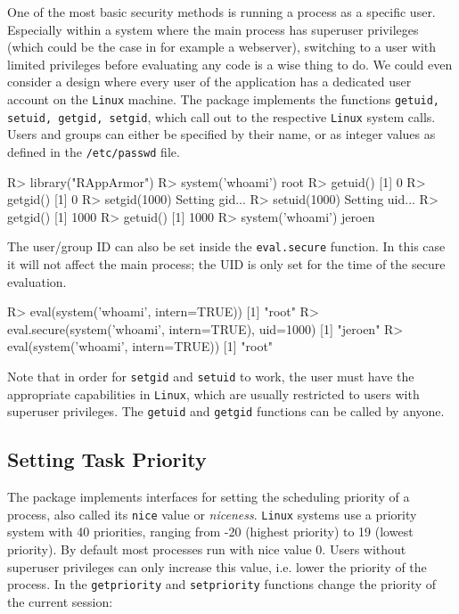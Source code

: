 \documentclass[article]{jss}
\newcommand{\RAppArmor}{\pkg{RAppArmor}\xspace}
\newcommand{\Linux}{\texttt{Linux}\xspace}
\begin{document}
One of the most basic security methods is running a process as a specific user.
Especially within a system where the main process has superuser privileges
(which could be the case in for example a webserver), switching to a user with
limited privileges before evaluating any code is a wise thing to do. We could
even consider a design where every user of the application has a dedicated
user account on the \Linux machine. The \RAppArmor package implements the
functions \texttt{getuid, setuid, getgid, setgid}, which call out to the
respective \Linux system calls. Users and groups can either be specified
by their name, or as integer values as defined in the \texttt{/etc/passwd} file.

\begin{CodeChunk}
\begin{CodeInput}
R> library("RAppArmor")
R> system('whoami')
root
R> getuid()
[1] 0
R> getgid()
[1] 0
R> setgid(1000)
Setting gid...
R> setuid(1000)
Setting uid...
R> getgid()
[1] 1000
R> getuid()
[1] 1000
R> system('whoami')
jeroen
\end{CodeInput}
\end{CodeChunk}

The user/group ID can also be set inside the \texttt{eval.secure} function. In
this case it will not affect the main process; the UID is only set for the time
of the secure evaluation.

\begin{CodeChunk}
\begin{CodeInput}
R> eval(system('whoami', intern=TRUE))
[1] "root"
R> eval.secure(system('whoami', intern=TRUE), uid=1000)
[1] "jeroen"
R> eval(system('whoami', intern=TRUE))
[1] "root"
\end{CodeInput}
\end{CodeChunk}

Note that in order for \texttt{setgid} and \texttt{setuid} to work, the user
must have the appropriate capabilities in \Linux, which are usually
restricted to users with superuser privileges. The \texttt{getuid} and
\texttt{getgid} functions can be called by anyone.

\subsection{Setting Task Priority}
\label{priority}

The \RAppArmor package implements interfaces for setting the scheduling priority
of a process, also called its \texttt{nice} value or \emph{niceness}. \Linux
systems use a priority system with 40 priorities, ranging from -20 (highest
priority) to 19 (lowest priority). By default most processes run with nice
value 0. Users without superuser privileges can only increase this value, i.e.
lower the priority of the process. In \RAppArmor the \texttt{getpriority} and
\texttt{setpriority} functions change the priority of the current session:
\end{document}
